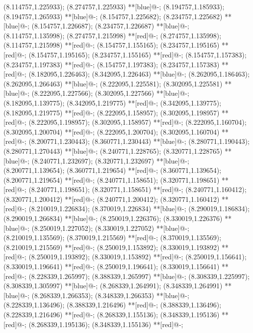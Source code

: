 (8.114757,1.225933); (8.274757,1.225933) **[blue]@{-};
(8.194757,1.185933); (8.194757,1.265933) **[blue]@{-};
(8.154757,1.225682); (8.234757,1.225682) **[blue]@{-};
(8.154757,1.226687); (8.234757,1.226687) **[blue]@{-};
(8.114757,1.135998); (8.274757,1.215998) **[red]@{-};
(8.274757,1.135998); (8.114757,1.215998) **[red]@{-};
(8.154757,1.155165); (8.234757,1.195165) **[red]@{-};
(8.154757,1.195165); (8.234757,1.155165) **[red]@{-};
(8.154757,1.157383); (8.234757,1.197383) **[red]@{-};
(8.154757,1.197383); (8.234757,1.157383) **[red]@{-};
(8.182095,1.226463); (8.342095,1.226463) **[blue]@{-};
(8.262095,1.186463); (8.262095,1.266463) **[blue]@{-};
(8.222095,1.225581); (8.302095,1.225581) **[blue]@{-};
(8.222095,1.227566); (8.302095,1.227566) **[blue]@{-};
(8.182095,1.139775); (8.342095,1.219775) **[red]@{-};
(8.342095,1.139775); (8.182095,1.219775) **[red]@{-};
(8.222095,1.158957); (8.302095,1.198957) **[red]@{-};
(8.222095,1.198957); (8.302095,1.158957) **[red]@{-};
(8.222095,1.160704); (8.302095,1.200704) **[red]@{-};
(8.222095,1.200704); (8.302095,1.160704) **[red]@{-};
(8.200771,1.230443); (8.360771,1.230443) **[blue]@{-};
(8.280771,1.190443); (8.280771,1.270443) **[blue]@{-};
(8.240771,1.228765); (8.320771,1.228765) **[blue]@{-};
(8.240771,1.232697); (8.320771,1.232697) **[blue]@{-};
(8.200771,1.139654); (8.360771,1.219654) **[red]@{-};
(8.360771,1.139654); (8.200771,1.219654) **[red]@{-};
(8.240771,1.158651); (8.320771,1.198651) **[red]@{-};
(8.240771,1.198651); (8.320771,1.158651) **[red]@{-};
(8.240771,1.160412); (8.320771,1.200412) **[red]@{-};
(8.240771,1.200412); (8.320771,1.160412) **[red]@{-};
(8.210019,1.226834); (8.370019,1.226834) **[blue]@{-};
(8.290019,1.186834); (8.290019,1.266834) **[blue]@{-};
(8.250019,1.226376); (8.330019,1.226376) **[blue]@{-};
(8.250019,1.227052); (8.330019,1.227052) **[blue]@{-};
(8.210019,1.135569); (8.370019,1.215569) **[red]@{-};
(8.370019,1.135569); (8.210019,1.215569) **[red]@{-};
(8.250019,1.153892); (8.330019,1.193892) **[red]@{-};
(8.250019,1.193892); (8.330019,1.153892) **[red]@{-};
(8.250019,1.156641); (8.330019,1.196641) **[red]@{-};
(8.250019,1.196641); (8.330019,1.156641) **[red]@{-};
(8.228339,1.265997); (8.388339,1.265997) **[blue]@{-};
(8.308339,1.225997); (8.308339,1.305997) **[blue]@{-};
(8.268339,1.264991); (8.348339,1.264991) **[blue]@{-};
(8.268339,1.266353); (8.348339,1.266353) **[blue]@{-};
(8.228339,1.136496); (8.388339,1.216496) **[red]@{-};
(8.388339,1.136496); (8.228339,1.216496) **[red]@{-};
(8.268339,1.155136); (8.348339,1.195136) **[red]@{-};
(8.268339,1.195136); (8.348339,1.155136) **[red]@{-};
